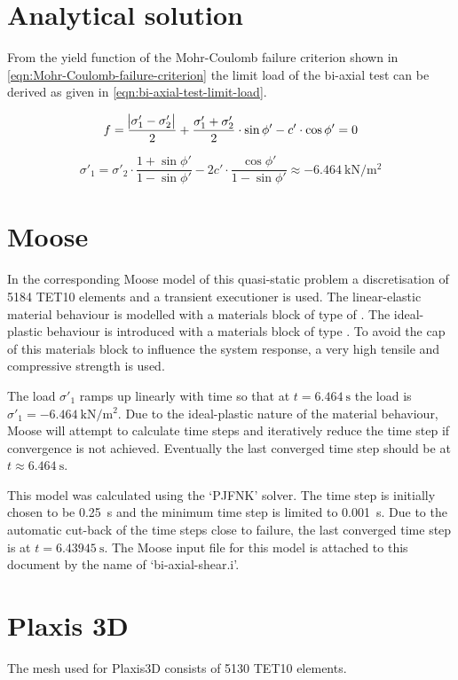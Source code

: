 \section{Analytical solution}

From the yield function of the Mohr-Coulomb failure criterion shown in
\autoref{eqn:Mohr-Coulomb-failure-criterion} the limit load of the bi-axial
test can be derived as given in \autoref{eqn:bi-axial-test-limit-load}.

\begin{equation}
    \label{eqn:Mohr-Coulomb-failure-criterion}
    f = \frac{\abs{\sigma'_1 - \sigma'_2}}{2} + \frac{\sigma'_1 + \sigma'_2}{2} \cdot \sin{\phi'} - c' \cdot \cos{\phi'} = 0
\end{equation}

\begin{equation}
    \label{eqn:bi-axial-test-limit-load}
    \sigma'_1 = \sigma'_2 \cdot \frac{1 + \sin{\phi'}}{1 - \sin{\phi'}} - 2c' \cdot \frac{\cos{\phi'}}{1 - \sin{\phi'}}
    \approx \qty{-6.464}{\kilo\newton\per\square\metre}
\end{equation}

\section{Moose}

In the corresponding Moose model of this quasi-static problem a discretisation
of \qty{5184}{} TET10 elements and a transient executioner is used. The
linear-elastic material behaviour is modelled with a materials block of type of
. The ideal-plastic behaviour is
introduced with a materials block of type
. To avoid the cap of this materials
block to influence the system response, a very high tensile and compressive
strength is used.

The load $\sigma'_1$ ramps up linearly with time so that at $t =
    \qty{6.464}{\second}$ the load is $\sigma'_1 =
    \qty{-6.464}{\kilo\newton\per\square\metre}$. Due to the ideal-plastic nature
of the material behaviour, Moose will attempt to calculate time steps and
iteratively reduce the time step if convergence is not achieved. Eventually the
last converged time step should be at $t \approx \qty{6.464}{\second}$.

This model was calculated using the ‘PJFNK’ solver. The time step is initially
chosen to be \qty{0.25}{\second} and the minimum time step is limited to
\qty{0.001}{\second}. Due to the automatic cut-back of the time steps close to
failure, the last converged time step is at $t=\qty{6.43945}{\second}$. The
Moose input file for this model is attached to this document by the name of
‘bi-axial-shear.i’.


\section{Plaxis 3D}

The mesh used for Plaxis3D consists of 5130 TET10 elements.